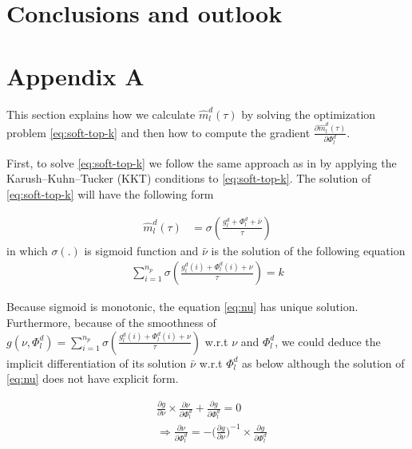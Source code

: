\documentclass[11pt]{article}
\begin{document}

%

\section{Conclusions and outlook}


\appendix
\section{Appendix A}
\label{appendix:a}
This section explains how we calculate $\hat{m}_l^d(\tau)$ by solving the optimization problem \eqref{eq:soft-top-k} and then how to compute the gradient $\frac{\partial \hat{m}_l^d(\tau)}{\partial \Phi_l^d}$.

First, to solve \eqref{eq:soft-top-k} we follow the same approach as in \cite{amos19lml,amos20differential} by applying the Karush–Kuhn–Tucker (KKT) conditions to \eqref{eq:soft-top-k}. The solution of \eqref{eq:soft-top-k} will have the following form

\begin{align}
\hat{m}_l^d(\tau) &= \sigma(\frac{g_l^d + \Phi_l^d + \bar{\nu}}{\tau}) \label{eq:soft-m}
\end{align}
in which $\sigma(.)$ is sigmoid function and $\bar{\nu}$ is the solution of the following equation
\begin{align}
\displaystyle{\mathop{\sum}_{i=1}^{n_p}} \sigma(\frac{g_l^d(i) + \Phi_l^d(i) + \nu}{\tau}) = k \label{eq:nu}
\end{align}

Because sigmoid is monotonic, the equation \eqref{eq:nu} has unique solution. Furthermore,  because of the smoothness of $g(\nu,\Phi_l^d) = \displaystyle{\mathop{\sum}_{i=1}^{n_p}} \sigma(\frac{g_l^d(i) + \Phi_l^d(i) + \nu}{\tau})$ w.r.t $\nu$ and $\Phi_l^d$, we could deduce the implicit differentiation of its solution $\bar{\nu}$ w.r.t $\Phi_l^d$ as below although the solution of \eqref{eq:nu} does not have explicit form.

\begin{align*}
&\frac{\partial g}{\partial \nu} \times \frac{\partial \nu}{\partial \Phi_l^d} + \frac{\partial g}{\partial \Phi_l^d} = 0 \\
& \Rightarrow \frac{\partial \nu}{\partial \Phi_l^d} = - \big(\frac{\partial g}{\partial \nu}\big)^{-1} \times \frac{\partial g}{\partial \Phi_l^d}
\end{align*}
\end{document}
